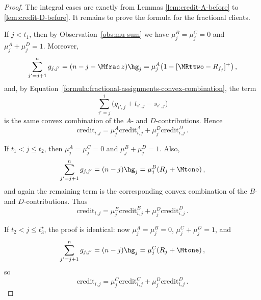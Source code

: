 \begin{proof}
    The integral cases are exactly from Lemmas \ref{lem:credit-A-before} to \ref{lem:credit-D-before}. It remains to prove the formula for the fractional clients.

    If $j<t_1$, then by Observation~\ref{obs:mu-sum} we have $\mu_j^B=\mu_j^C=0$ and $\mu_j^A+\mu_j^D=1$. Moreover,
    \begin{equation*}
        \sum_{j'=j+1}^{n} g_{j,j'}=(n-j-\Mfrac\, z)\hg_j=
        \mu_j^A\bigl(1-[\MRttwo-R_{f_j}]^+\bigr)\,,
    \end{equation*}
    and, by Equation~\ref{formula:fractional-assignments-convex-combination}, the term
    \begin{equation*}
        \sum_{i'=j}^{i} \bigl(g_{i',j}+t_{i',j}-s_{i',j}\bigr)
    \end{equation*}
    is the same convex combination of the $A$- and $D$-contributions. Hence
    \begin{equation*}
        \text{credit}_{i,j}=
        \mu_j^A\text{credit}_{i,j}^A+
        \mu_j^D\text{credit}_{i,j}^D\,.
    \end{equation*}

    If $t_1<j\le t_2$, then $\mu_j^A=\mu_j^C=0$ and $\mu_j^B+\mu_j^D=1$. Also,
    \begin{equation*}
        \sum_{j'=j+1}^{n} g_{j,j'}=(n-j)\hg_j=
        \mu_j^B(R_j+\Mtone)\,,
    \end{equation*}
    and again the remaining term is the corresponding convex combination of the $B$- and $D$-contributions. Thus
    \begin{equation*}
        \text{credit}_{i,j}=
        \mu_j^B\text{credit}_{i,j}^B+
        \mu_j^D\text{credit}_{i,j}^D\,.
    \end{equation*}

    If $t_2<j\le t_3^\star$, the proof is identical: now $\mu_j^A=\mu_j^B=0$, $\mu_j^C+\mu_j^D=1$, and
    \begin{equation*}
        \sum_{j'=j+1}^{n} g_{j,j'}=(n-j)\hg_j=
        \mu_j^C(R_j+\Mtone)\,,
    \end{equation*}
    so
    \begin{equation*}
        \text{credit}_{i,j}=
        \mu_j^C\text{credit}_{i,j}^C+
        \mu_j^D\text{credit}_{i,j}^D\,.
    \end{equation*}


\end{proof}
